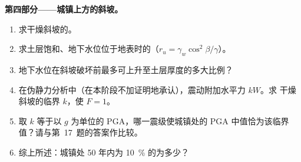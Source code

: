 \begin{problem}
\noindent\textbf{第四部分——城镇上方的斜坡。}
\begin{enumerate}[resume]
  \item 求干燥斜坡的。
  \item 求土层饱和、地下水位位于地表时的（$r_u =
        \gamma_w\cos^2\beta/\gamma$）。
  \item 地下水位在斜坡破坏前最多可上升至土层厚度的多大比例？
  \item 在伪静力分析中（在本阶段不加证明地承认），震动附加水平力 $kW$。求
        干燥斜坡的临界 $k$，使 $F = 1$。
  \item 取 $k$ 等于以 $g$ 为单位的 PGA，哪一震级使城镇处的
        PGA 中值恰为该临界值？请与第~17~题的答案作比较。
  \item 综上所述：城镇处 50 年内为
        \qty{10}{\percent} 的为多少？
\end{enumerate}
\end{problem}
